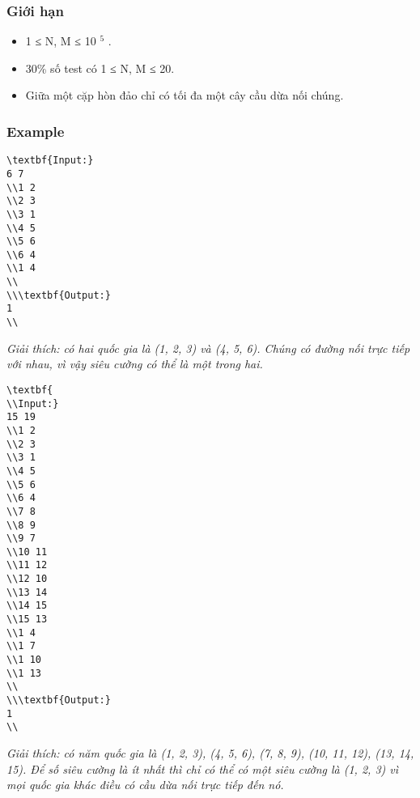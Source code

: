 \subsubsection{   Giới hạn  }
\begin{itemize}
	\item     1 ≤ N, M ≤ 10    $^     5    $    .   
	\item     30\% số test có 1 ≤ N, M ≤ 20.   
	\item     Giữa một cặp hòn đảo chỉ có tối đa một cây cầu dừa nối chúng.   
\end{itemize}

\subsubsection{   Example  }
\begin{verbatim}
\textbf{Input:}
6 7
\\1 2
\\2 3
\\3 1
\\4 5
\\5 6
\\6 4
\\1 4
\\
\\\textbf{Output:}
1
\\\end{verbatim}

\emph{    Giải thích: có hai quốc gia là (1, 2, 3) và (4, 5, 6). Chúng có đường nối trực tiếp với nhau, vì vậy siêu cường có thể là một trong hai.   }
\begin{verbatim}
\textbf{
\\Input:}
15 19
\\1 2
\\2 3
\\3 1
\\4 5
\\5 6
\\6 4
\\7 8
\\8 9
\\9 7
\\10 11
\\11 12
\\12 10
\\13 14
\\14 15
\\15 13
\\1 4
\\1 7
\\1 10
\\1 13
\\
\\\textbf{Output:}
1
\\\end{verbatim}

\emph{    Giải thích: có năm quốc gia là (1, 2, 3), (4, 5, 6), (7, 8, 9), (10, 11, 12), (13, 14, 15). Để số siêu cường là ít nhất thì chỉ có thể có một siêu cường là (1, 2, 3) vì mọi quốc gia khác điều có cầu dừa nối trực tiếp đến nó.   }